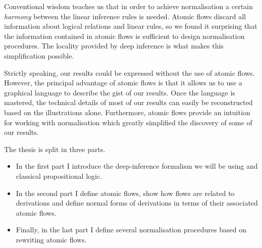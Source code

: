 Conventional wisdom teaches us that in order to achieve normalisation a certain \emph{harmony} between the linear inference rules is needed. Atomic flows discard all information about logical relations and linear rules, so we found it surprising that the information contained in atomic flows is sufficient to design normalisation procedures. The locality provided by deep inference is what makes this simplification possible.


Strictly speaking, our results could be expressed without the use of atomic flows. However, the principal advantage of atomic flows is that it allows us to use a graphical language to describe the gist of our results. Once the language is mastered, the technical details of most of our results can easily be reconstructed based on the illustrations alone. Furthermore, atomic flows provide an intuition for working with normalisation which greatly simplified the discovery of some of our results.





The thesis is split in three parts.
\begin{itemize}
\item In the first part I introduce the deep-inference formalism we will be using and classical propositional logic.
\item In the second part I define atomic flows, show how flows are related to derivations and define normal forms of derivations in terms of their associated atomic flows.
\item Finally, in the last part I define several normalisation procedures based on rewriting atomic flows.
\end{itemize}